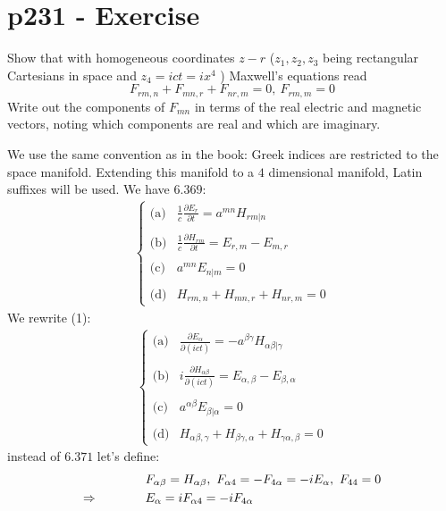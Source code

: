 \section{p231 - Exercise}
\begin{tcolorbox}
Show that with homogeneous coordinates $z-r$ ($z_1,z_2,z_3$ being rectangular Cartesians in space and $z_4= ict=ix^4$ ) Maxwell's equations read
$$ F_{rm,n}+F_{mn,r}+F_{nr,m}=0, \ F_{rm,m}=0$$
Write out the components of $F_{mn}$ in terms of the real electric and magnetic vectors, noting which components are real and which are imaginary.
\end{tcolorbox}
We use the same convention as in the book: Greek indices are restricted to the space manifold. Extending this manifold to a $4$ dimensional manifold, Latin suffixes will be used.
We have $\mathbf{6.369}$:
\begin{align}
\left\{\begin{array}{ll}
\text{(a)}&\frac{1}{c}\frac{\partial E_r}{\partial t}= a^{mn}H_{rm|n}\\\\
\text{(b)}&\frac{1}{c}\frac{\partial H_{rm}}{\partial t}= E_{r,m}-E_{m,r}\\\\
\text{(c)}&a^{mn}E_{n|m}=0\\\\
\text{(d)}&H_{rm,n}+H_{mn,r}+H_{nr,m}=0
\end{array}\right.
\end{align}
We rewrite (1):
\begin{align}
\left\{\begin{array}{ll}
\text{(a)}&\frac{\partial E_{\alpha}}{\partial (ict)}= -a^{\beta\gamma}H_{\alpha\beta|\gamma}\\\\
\text{(b)}&i\frac{\partial H_{\alpha\beta}}{\partial (ict)}= E_{\alpha,\beta}-E_{\beta,\alpha}\\\\
\text{(c)}&a^{\alpha\beta}E_{\beta|\alpha}=0\\\\
\text{(d)}&H_{\alpha\beta,\gamma}+H_{\beta\gamma,\alpha}+H_{\gamma\alpha,\beta}=0
\end{array}\right.
\end{align}
instead of  $\mathbf{6.371}$ let's define:
\begin{align}
&F_{\alpha\beta} =H_{\alpha\beta} , \  F_{\alpha4} =-F_{4\alpha} =-iE_{\alpha}, \ F_{44}=0\\
\Rightarrow \quad\quad\quad\quad &E_{\alpha}= iF_{\alpha4} =-iF_{4\alpha}
\end{align}

